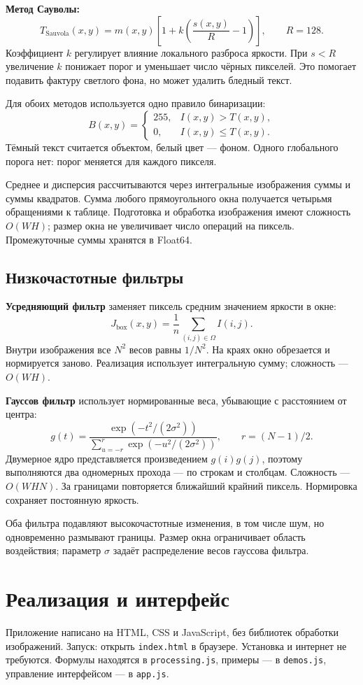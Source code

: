 \documentclass[12pt,a4paper]{article}
\begin{document}
\textbf{Метод Сауволы:}
\[T_{\mathrm{Sauvola}}(x,y)=m(x,y)\left[1+k\left(\frac{s(x,y)}{R}-1\right)\right],\qquad R=128.\]
Коэффициент $k$ регулирует влияние локального разброса яркости. При $s<R$ увеличение $k$ понижает порог и уменьшает число чёрных пикселей. Это помогает подавить фактуру светлого фона, но может удалить бледный текст.

Для обоих методов используется одно правило бинаризации:
\[B(x,y)=\begin{cases}255,&I(x,y)>T(x,y),\\0,&I(x,y)\le T(x,y).\end{cases}\]
Тёмный текст считается объектом, белый цвет --- фоном. Одного глобального порога нет: порог меняется для каждого пикселя.

Среднее и дисперсия рассчитываются через интегральные изображения суммы и суммы квадратов. Сумма любого прямоугольного окна получается четырьмя обращениями к таблице. Подготовка и обработка изображения имеют сложность $O(WH)$; размер окна не увеличивает число операций на пиксель. Промежуточные суммы хранятся в Float64.

\subsection{Низкочастотные фильтры}
\textbf{Усредняющий фильтр} заменяет пиксель средним значением яркости в окне:
\[J_{\mathrm{box}}(x,y)=\frac1n\sum_{(i,j)\in\Omega} I(i,j).\]
Внутри изображения все $N^2$ весов равны $1/N^2$. На краях окно обрезается и нормируется заново. Реализация использует интегральную сумму; сложность --- $O(WH)$.

\textbf{Гауссов фильтр} использует нормированные веса, убывающие с расстоянием от центра:
\[g(t)=\frac{\exp(-t^2/(2\sigma^2))}{\sum_{u=-r}^{r}\exp(-u^2/(2\sigma^2))},\qquad r=(N-1)/2.\]
Двумерное ядро представляется произведением $g(i)g(j)$, поэтому выполняются два одномерных прохода --- по строкам и столбцам. Сложность --- $O(WHN)$. За границами повторяется ближайший крайний пиксель. Нормировка сохраняет постоянную яркость.

Оба фильтра подавляют высокочастотные изменения, в том числе шум, но одновременно размывают границы. Размер окна ограничивает область воздействия; параметр $\sigma$ задаёт распределение весов гауссова фильтра.

\section{Реализация и интерфейс}
Приложение написано на HTML, CSS и JavaScript, без библиотек обработки изображений. Запуск: открыть \texttt{index.html} в браузере. Установка и интернет не требуются. Формулы находятся в \texttt{processing.js}, примеры --- в \texttt{demos.js}, управление интерфейсом --- в \texttt{app.js}.
\end{document}
